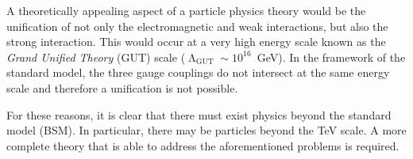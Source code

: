 A theoretically appealing aspect of a particle physics theory would be the 
unification of not only the electromagnetic and weak interactions, but also the 
strong interaction. This would occur at a very high energy scale known as the 
\textit{Grand Unified Theory} (GUT) scale ($\upLambda_{\mathrm{GUT}} \sim 
10^{16}$~GeV). In the framework of the standard model, the three gauge 
couplings do not intersect at the same energy scale and therefore a unification 
is not possible.

For these reasons, it is clear that there must exist physics beyond the 
standard model (BSM). In particular, there may be particles beyond the TeV 
scale. 
A more complete theory that is able to address the aforementioned 
problems is required.

